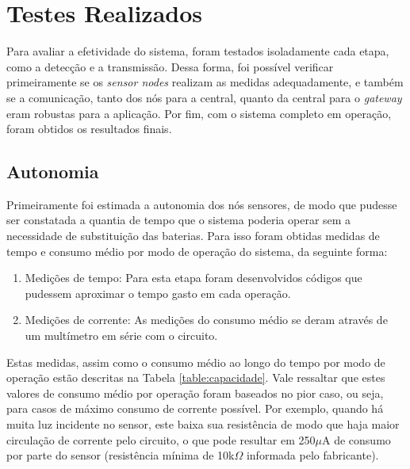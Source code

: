 \documentclass[oneside,openright,12pt]{ufsm_2015} %
\begin{document}
    \section{Testes Realizados}
    Para avaliar a efetividade do sistema, foram testados isoladamente cada etapa, como a detecção e a transmissão. Dessa forma, foi possível verificar primeiramente se os \textit{sensor nodes} realizam as medidas adequadamente, e também se a comunicação, tanto dos nós para a central, quanto da central para o \textit{gateway} eram robustas para a aplicação. Por fim, com o sistema completo em operação, foram obtidos os resultados finais.
    
    \subsection{Autonomia} \label{subsection:autonomia}
    Primeiramente foi estimada a autonomia dos nós sensores, de modo que pudesse ser constatada a quantia de tempo que o sistema poderia operar sem a necessidade de substituição das baterias. Para isso foram obtidas medidas de tempo e consumo médio por modo de operação do sistema, da seguinte forma:
    
    \begin{enumerate}
        \item Medições de tempo: Para esta etapa foram desenvolvidos códigos que pudessem aproximar o tempo gasto em cada operação. 
        
        \item Medições de corrente: As medições do consumo médio se deram através de um multímetro em série com o circuito.
    \end{enumerate}
    
    Estas medidas, assim como o consumo médio ao longo do tempo por modo de operação estão descritas na Tabela \ref{table:capacidade}. Vale ressaltar que estes valores de consumo médio por operação foram baseados no pior caso, ou seja, para casos de máximo consumo de corrente possível. Por exemplo, quando há muita luz incidente no sensor, este baixa sua resistência de modo que haja maior circulação de corrente pelo circuito, o que pode resultar em 250$\mu$A de consumo por parte do sensor (resistência mínima  de 10k$\Omega$ informada pelo fabricante).
    
\end{document}
